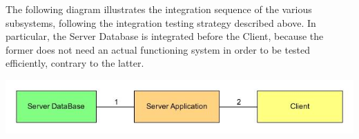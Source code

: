 The following diagram illustrates the integration sequence of the various subsystems, following the integration testing strategy described above. In particular, the Server Database is integrated before the Client, because the former does not need an actual functioning system in order to be tested efficiently, contrary to the latter.

\begin{center}
	\includegraphics[width=\textwidth]{diagrams/SubsystemsIntegrationDiagram.jpg}
\end{center}